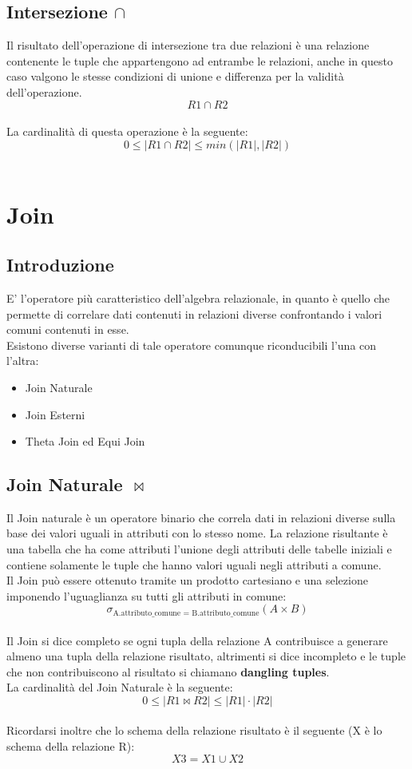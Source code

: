 \documentclass{report}
\begin{document}
\subsection{Intersezione $\cap$}
Il risultato dell'operazione di intersezione tra due relazioni è una relazione contenente le tuple che appartengono ad entrambe le relazioni, anche in questo caso valgono le stesse condizioni di unione e differenza per la validità dell'operazione.\\
$$R1 \cap R2$$\\
La cardinalità di questa operazione è la seguente:\\
$$ 0 \leq |R1 \cap R2| \leq min(|R1|, |R2|)$$\\

\section{Join}
\subsection{Introduzione}
E’ l’operatore più caratteristico dell’algebra relazionale, in quanto è quello che permette di correlare dati contenuti in relazioni diverse confrontando i valori comuni contenuti in esse.\\
Esistono diverse varianti di tale operatore comunque riconducibili l’una con l’altra:
\begin{itemize} 
    \item Join Naturale
    \item Join Esterni
    \item Theta Join ed Equi Join\\
\end{itemize}
\subsection{Join Naturale $\bowtie$}
Il Join naturale è un operatore binario che correla dati in relazioni diverse sulla base dei valori uguali in attributi con lo stesso nome. La relazione risultante è una tabella che ha come attributi l’unione degli attributi delle tabelle iniziali e contiene solamente le tuple che hanno valori uguali negli attributi a comune.\\
Il Join può essere ottenuto tramite un prodotto cartesiano e una selezione imponendo l’uguaglianza su tutti gli attributi in comune:\\
$$\sigma_{\text{A.attributo\_comune = B.attributo\_comune}}(A \times B)$$\\
Il Join si dice completo se ogni tupla della relazione A contribuisce a generare almeno una tupla della relazione risultato, altrimenti si dice incompleto e le tuple che non contribuiscono al risultato si chiamano \textbf{dangling tuples}.\\
La cardinalità del Join Naturale è la seguente:\\
$$0 \leq |R1 \bowtie R2| \leq |R1| \cdot |R2|$$\\
Ricordarsi inoltre che lo schema della relazione risultato è il seguente (X è lo schema della relazione R):\\
$$X3 = X1 \cup X2$$\\
\newpage
\end{document}
